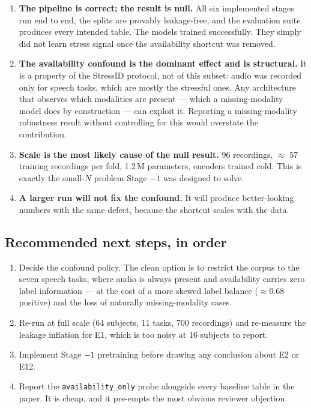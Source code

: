 \documentclass[11pt,a4paper]{article}
\newcommand{\code}[1]{\texttt{\small #1}}
\begin{document}
\begin{enumerate}\itemsep4pt
\item \textbf{The pipeline is correct; the result is null.} All six implemented stages run
      end to end, the splits are provably leakage-free, and the evaluation suite produces
      every intended table. The models trained successfully. They simply did not learn
      stress signal once the availability shortcut was removed.

\item \textbf{The availability confound is the dominant effect and is structural.} It is a
      property of the StressID protocol, not of this subset: audio was recorded only for
      speech tasks, which are mostly the stressful ones. Any architecture that observes
      which modalities are present --- which a missing-modality model does by construction
      --- can exploit it. Reporting a missing-modality robustness result without
      controlling for this would overstate the contribution.

\item \textbf{Scale is the most likely cause of the null result.} 96 recordings,
      $\approx$ 57 training recordings per fold, 1.2\,M parameters, encoders trained cold.
      This is exactly the small-$N$ problem Stage $-1$ was designed to solve.

\item \textbf{A larger run will not fix the confound.} It will produce better-looking
      numbers with the same defect, because the shortcut scales with the data.
\end{enumerate}

\subsection*{Recommended next steps, in order}
\begin{enumerate}\itemsep2pt
\item Decide the confound policy. The clean option is to restrict the corpus to the seven
      speech tasks, where audio is always present and availability carries zero label
      information --- at the cost of a more skewed label balance ($\approx 0.68$ positive)
      and the loss of naturally missing-modality cases.
\item Re-run at full scale (64 subjects, 11 tasks, 700 recordings) and re-measure the
      leakage inflation for E1, which is too noisy at 16 subjects to report.
\item Implement Stage $-1$ pretraining before drawing any conclusion about E2 or E12.
\item Report the \code{availability\_only} probe alongside every baseline table in the
      paper. It is cheap, and it pre-empts the most obvious reviewer objection.
\end{enumerate}
\end{document}
